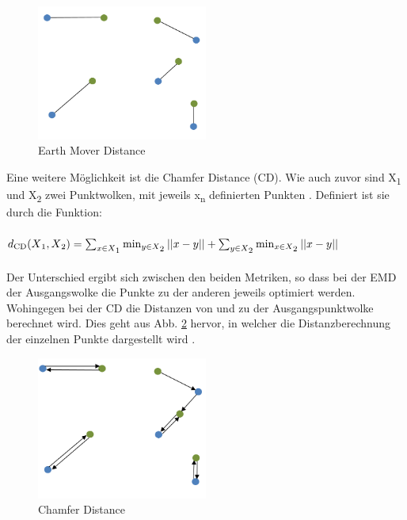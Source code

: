 \documentclass{llncs}
\begin{document}
\begin{figure}[htbp] 
	\centering
	\includegraphics[width=0.5\textwidth]{emd_distance.png}
	\caption{Earth Mover Distance}
	\label{fig:Bild14}
\end{figure}		
Eine weitere Möglichkeit ist die Chamfer Distance (CD). Wie auch zuvor sind  X\textsubscript{1} und X\textsubscript{2} zwei Punktwolken, mit jeweils x\textsubscript{n} definierten Punkten \cite{autoencoderloss}. Definiert ist sie durch die Funktion:
\\\\
\begin{math}
d\textsubscript{CD}(X\textsubscript{1},X\textsubscript{2})=\sum_{x\in X\textsubscript{1}} \min_{y \in X\textsubscript{2}}||x-y|| + \sum_{y\in X\textsubscript{2}} \min_{x \in X\textsubscript{2}}||x-y||
\end{math}
\\\\
Der Unterschied ergibt sich zwischen den beiden Metriken, so dass bei der EMD der Ausgangswolke die Punkte zu der anderen jeweils optimiert werden. Wohingegen bei der CD die Distanzen von und zu der Ausgangspunktwolke berechnet wird. Dies geht aus Abb. \ref{fig:Bild15} hervor, in welcher die Distanzberechnung der einzelnen Punkte dargestellt wird \cite{autoencoderloss}.
\begin{figure}[htbp] 
	\centering
	\includegraphics[width=0.5\textwidth]{champfer.png}
	\caption{Chamfer Distance}
	\label{fig:Bild15}
\end{figure} 
\newpage
\end{document}
